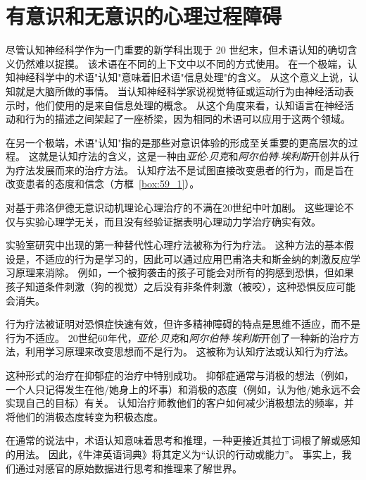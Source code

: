 \chapter{有意识和无意识的心理过程障碍} \label{chap:chap59}

尽管认知神经科学作为一门重要的新学科出现于 20 世纪末，但术语认知的确切含义仍然难以捉摸。
该术语在不同的上下文中以不同的方式使用。
在一个极端，认知神经科学中的术语"认知"意味着旧术语"信息处理"的含义。
从这个意义上说，认知就是大脑所做的事情。
当认知神经科学家说视觉特征或运动行为由神经活动表示时，他们使用的是来自信息处理的概念。
从这个角度来看，认知语言在神经活动和行为的描述之间架起了一座桥梁，因为相同的术语可以应用于这两个领域。


在另一个极端，术语"认知"指的是那些对意识体验的形成至关重要的更高层次的过程。
这就是认知疗法的含义，这是一种由\textit{亚伦$\cdot$贝克}和\textit{阿尔伯特$\cdot$埃利斯}开创并从行为疗法发展而来的治疗方法。
认知疗法不是试图直接改变患者的行为，而是旨在改变患者的态度和信念（方框~\ref{box:59_1}）。



\begin{proposition}[认知疗法] \label{box:59_1}
	
	\quad \quad 对基于弗洛伊德无意识动机理论心理治疗的不满在20世纪中叶加剧。
	这些理论不仅与实验心理学无关，而且没有经验证据表明心理动力学治疗确实有效。
	
	\quad \quad 实验室研究中出现的第一种替代性心理疗法被称为行为疗法。
	这种方法的基本假设是，不适应的行为是学习的，因此可以通过应用巴甫洛夫和斯金纳的刺激反应学习原理来消除。
	例如，一个被狗袭击的孩子可能会对所有的狗感到恐惧，但如果孩子知道条件刺激（狗的视觉）之后没有非条件刺激（被咬），这种恐惧反应可能会消失。
	
	\quad \quad 行为疗法被证明对恐惧症快速有效，但许多精神障碍的特点是思维不适应，而不是行为不适应。
	20世纪60年代，\textit{亚伦$\cdot$贝克}和\textit{阿尔伯特$\cdot$埃利斯}开创了一种新的治疗方法，利用学习原理来改变思想而不是行为。
	这被称为认知疗法或认知行为疗法。
	
	\quad \quad 这种形式的治疗在抑郁症的治疗中特别成功。
	抑郁症通常与消极的想法（例如，一个人只记得发生在他/她身上的坏事）和消极的态度（例如，认为他/她永远不会实现自己的目标）有关。
	认知治疗师教他们的客户如何减少消极想法的频率，并将他们的消极态度转变为积极态度。
	
\end{proposition}



在通常的说法中，术语认知意味着思考和推理，一种更接近其拉丁词根了解或感知的用法。
因此，《牛津英语词典》将其定义为“认识的行动或能力”。
事实上，我们通过对感官的原始数据进行思考和推理来了解世界。


